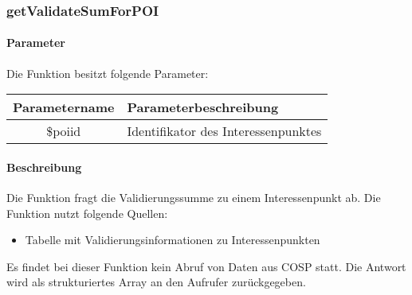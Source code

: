\subsubsection{getValidateSumForPOI}
\paragraph{Parameter} Die Funktion besitzt folgende Parameter:
\begin{table}[H]
	\begin{tabular}{|c|p{11cm}|}
		\hline
		\textbf{Parametername} & \textbf{Parameterbeschreibung} \\ \hline
		\$poiid & Identifikator des Interessenpunktes \\ \hline
	\end{tabular}
\end{table}
\paragraph{Beschreibung} Die Funktion fragt die Validierungssumme zu einem Interessenpunkt ab. Die Funktion nutzt folgende Quellen:
\begin{itemize}
	\item Tabelle mit Validierungsinformationen zu Interessenpunkten
\end{itemize}
Es findet bei dieser Funktion kein Abruf von Daten aus {\glqq COSP\grqq} statt. Die Antwort wird als strukturiertes Array an den Aufrufer zurückgegeben.